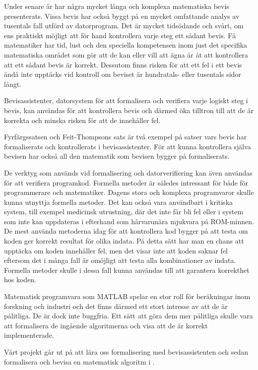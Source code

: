 Under senare år har några mycket långa och komplexa matematiska bevis
presenterats. Vissa bevis har också byggt på en mycket omfattande analys av
tusentals fall utförd av datorprogram. Det är mycket tidsödande och svårt, om
ens praktiskt möjligt att för hand kontrollera varje steg ett sådant bevis. Få
matematiker har tid, lust och den speciella kompetensen inom just det specifika
matematiska området som gör att de kan eller vill att ägna år åt att
kontrollera att ett sådant bevis är korrekt. Dessutom finns risken för att ett
fel i ett bevis ändå inte upptäcks vid kontroll om beviset är hundratals- eller
tusentals sidor långt.\cite{harrison2008formal}

Bevisassistenter, datorsystem för att formalisera och verifiera varje logiskt
steg i bevis, kan användas för att kontrollera bevis och därmed öka tilltron
till att de är korrekta och minska risken för att de innehåller fel.

Fyrfärgssatsen\cite{gonthier2008formal} och Feit-Thompsons
sats\cite{aschbacher2004status} är två exempel på satser vars bevis har
formaliserats och kontrollerats i bevisassistenter. För att kunna kontrollera
själva bevisen har också all den matematik som bevisen bygger på formaliserats.

De verktyg som används vid formalisering och datorverifiering kan även användas
för att verifiera programkod. Formella metoder är således intressant för både
för programmerare och matematiker. Dagens stora och komplexa programvaror
skulle kunna utnyttja formella metoder. Det kan också vara användbart i
kritiska system, till exempel medicinsk utrustning,  där det inte får bli fel
eller i system som inte kan uppdateras i efterhand som hårvarunära mjukvara
på ROM-minnen. De mest använda metoderna idag för
att kontrollera kod bygger på att testa om koden ger korrekt resultat för olika
indata. På detta sätt har man en chans att upptäcka om koden innehåller fel,
men det visar inte att koden saknar fel eftersom det i många fall är omöjligt
att testa alla kombinationer av indata.
Formella metoder skulle i dessa fall
kunna användas till att garantera korrekthet hos koden.

Matematisk programvara som MATLAB spelar en stor roll för beräkningar inom
forskning och industri och det finns därmed ett stort intresse av att de är
pålitliga. De är dock inte buggfria. Ett sätt att göra dem mer pålitliga skulle
vara att formalisera de ingående algoritmerna och visa att de är korrekt
implementerade.\cite{mortberg2012}

Vårt projekt går ut på att lära oss formalisering med bevisassistenten \coq och
sedan formalisera och bevisa en matematisk algoritm i \coq.
